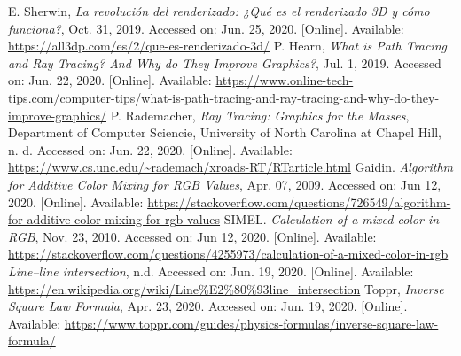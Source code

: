 \documentclass[conference]{IEEEtran}
\begin{document}
\begin{thebibliography}{00}
 E. Sherwin, \textit{La revolución del renderizado: ¿Qué es el renderizado 3D y cómo funciona?}, Oct. 31, 2019. Accessed on: Jun. 25, 2020. [Online].  Available: \url{https://all3dp.com/es/2/que-es-renderizado-3d/}
 P. Hearn, \textit{What is Path Tracing and Ray Tracing? And Why do They Improve Graphics?}, Jul. 1, 2019. Accessed on: Jun. 22, 2020. [Online]. Available: \url{https://www.online-tech-tips.com/computer-tips/what-is-path-tracing-and-ray-tracing-and-why-do-they-improve-graphics/}
 P. Rademacher, \textit{Ray Tracing: Graphics for the Masses}, Department of Computer Sciencie, University of North Carolina at Chapel Hill, n. d. Accessed on: Jun. 22, 2020. [Online]. Available: \url{https://www.cs.unc.edu/~rademach/xroads-RT/RTarticle.html}
 Gaidin. \textit{Algorithm for Additive Color Mixing for RGB Values}, Apr. 07, 2009. Accessed on: Jun 12, 2020. [Online]. Available: \url{https://stackoverflow.com/questions/726549/algorithm-for-additive-color-mixing-for-rgb-values}
 SIMEL. \textit{Calculation of a mixed color in RGB}, Nov. 23, 2010. Accessed on: Jun 12, 2020. [Online]. Available: \url{https://stackoverflow.com/questions/4255973/calculation-of-a-mixed-color-in-rgb}
 \textit{Line–line intersection}, n.d. Accessed on: Jun. 19, 2020. [Online]. Available: \url{https://en.wikipedia.org/wiki/Line\%E2\%80\%93line_intersection}
 Toppr, \textit{Inverse Square Law Formula}, Apr. 23, 2020. Accessed on: Jun. 19, 2020. [Online]. Available: \url{https://www.toppr.com/guides/physics-formulas/inverse-square-law-formula/}
\end{thebibliography}
\end{document}
